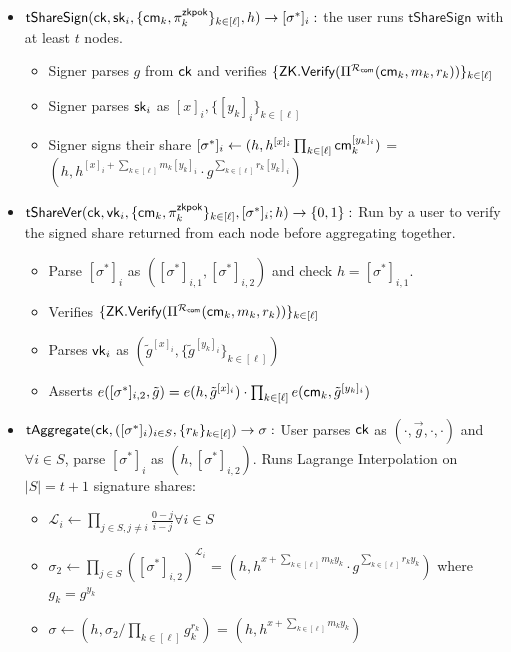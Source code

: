 \begin{itemize}
    \item $\mathsf{tShareSign}(\mathsf{ck}, \mathsf{sk}_i, \{\mathsf{cm}_k, \pi_k^{\mathsf{zkpok}}\}_{k \in [\ell]}, h) \to [\sigma^*]_i:$ the user runs $\mathsf{tShareSign}$ with at least $t$ nodes. 
    \begin{itemize}
        \item Signer parses $g$ from $\mathsf{ck}$ and verifies $\{\mathsf{ZK.Verify}(\Pi^{\mathcal{R}_{\mathsf{com}}}(\mathsf{cm}_k, m_k, r_k))\}_{k \in [\ell]}$
        \item Signer parses $\mathsf{sk}_i$ as $[x]_i, \{[y_k]_i\}_{k \in [\ell]}$
        \item Signer signs their share $[\sigma^*]_i \gets (h, h^{[x]_i} \prod_{k \in [\ell]} \mathsf{cm}_k^{[y_k]_i} )$ = $(h, h^{[x]_i + \sum_{k \in [\ell]} m_k[y_k]_i} \cdot g^{\sum_{k \in [\ell]} r_k [y_k]_i})$
    \end{itemize}
    
    \item $\mathsf{tShareVer}(\mathsf{ck}, \mathsf{vk}_i, \{\mathsf{cm}_k, \pi_k^{\mathsf{zkpok}}\}_{k \in [\ell]}, [\sigma^*]_i; h) \to \{0,1\}:$ Run by a user to verify the signed share returned from each node before aggregating together. 
    \begin{itemize}
        \item Parse $[\sigma^*]_i$ as $([\sigma^*]_{i,1}, [\sigma^*]_{i,2})$ and check $h = [\sigma^*]_{i,1}$. 
        \item Verifies $\{\mathsf{ZK.Verify}(\Pi^{\mathcal{R}_{\mathsf{com}}}(\mathsf{cm}_k, m_k, r_k))\}_{k \in [\ell]}$
        \item Parses $\mathsf{vk}_i$ as $(\tilde{g}^{[x]_i}, \{\tilde{g}^{[y_k]_i}\}_{k \in [\ell]})$
        \item Asserts $e([\sigma^*]_{i,2}, \tilde{g}) = e(h, \tilde{g}^{[x]_i}) \cdot \prod_{k \in [\ell]} e(\mathsf{cm}_k, \tilde{g}^{[y_k]_i})$
    \end{itemize}

    \item $\mathsf{tAggregate}(\mathsf{ck}, ([\sigma^*]_i)_{i \in S}, \{r_k\}_{k \in [\ell]}) \to \sigma:$ User parses $\mathsf{ck}$ as $(\cdot, \vec{g}, \cdot, \cdot)$ and $\forall i \in S$, parse $[\sigma^*]_i$ as $(h, [\sigma^*]_{i,2})$. Runs Lagrange Interpolation on $|S|=t+1$ signature shares:
    \begin{itemize}
        \item  $\mathcal{L}_i \gets \prod_{j \in S, j\neq i}\frac{0-j}{i-j} \forall i \in S$
        \item $\sigma_2 \gets \prod_{j \in S}([\sigma^*]_{i,2})^{\mathcal{L}_i}$ = 
        $(h, h^{x + \sum_{k \in [\ell]} m_ky_k} \cdot g^{\sum_{k \in [\ell]} r_ky_k})$ where $g_k = g^{y_k}$
        \item $\sigma \gets (h, \sigma_2 / \prod_{k \in [\ell]}g_k^{r_k})$ = $(h, h^{x + \sum_{k \in [\ell]}m_ky_k})$
    \end{itemize}


\end{itemize}
